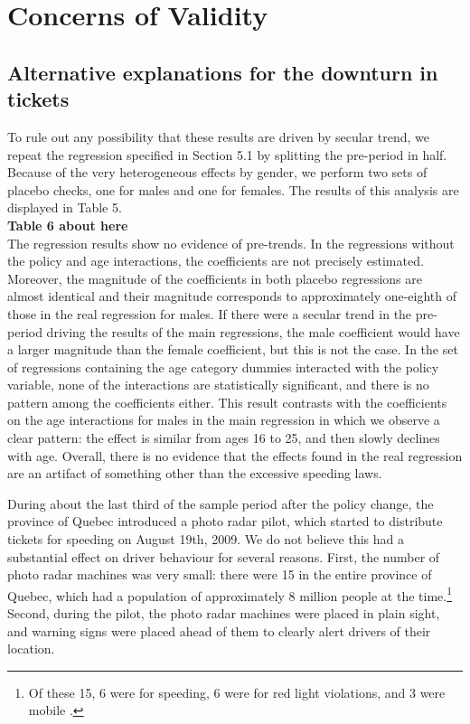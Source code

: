 \section{Concerns of Validity}
\label{sec:Validity}


\subsection{Alternative explanations for the downturn in tickets}

To rule out any possibility that these results are driven by secular trend, we repeat the regression specified in Section 5.1 by splitting the pre-period in half. Because of the very heterogeneous effects by gender, we perform two sets of placebo checks, one for males and one for females. The results of this analysis are displayed in Table 5. \\

\textbf{Table 6 about here} \\

The regression results show no evidence of pre-trends. In the regressions without the policy and age interactions, the coefficients are not precisely estimated. Moreover, the magnitude of the coefficients in both placebo regressions are almost identical and their magnitude corresponds to approximately one-eighth of those in the real regression for males. If there were a secular trend in the pre-period driving the results of the main regressions, the male coefficient would have a larger magnitude than the female coefficient, but this is not the case. In the set of regressions containing the age category dummies interacted with the policy variable, none of the interactions are statistically significant, and there is no pattern among the coefficients either. This result contrasts with the coefficients on the age interactions for males in the main regression in which we observe a clear pattern: the effect is similar from ages 16 to 25, and then slowly declines with age. Overall, there is no evidence that the effects found in the real regression are an artifact of something other than the excessive speeding laws.

During about the last third of the sample period after the policy change, the province of Quebec introduced a photo radar pilot, which started to distribute tickets for speeding on August 19th, 2009. We do not believe this had a substantial effect on driver behaviour for several reasons. First, the number of photo radar machines was very small: there were 15 in the entire province of Quebec, which had a population of approximately 8 million people at the time.\footnote{%
Of these 15, 6 were for speeding, 6 were for red light violations, and 3 were mobile 
\citet{bisson2020}.
}  
Second, during the pilot, the photo radar machines were placed in plain sight, and warning signs were placed ahead of them to clearly alert drivers of their location.

